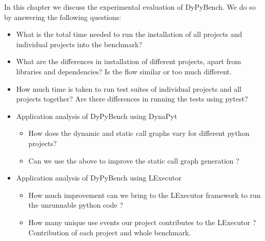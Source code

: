 In this chapter we discuss the experimental evaluation of DyPyBench. We do so by answering the following questions:
\begin{itemize}
    \item What is the total time needed to run the installation of all projects and individual projects into the benchmark?
    \item What are the differences in installation of different projects, apart from libraries and dependencies? Is the flow similar or too much different.
    \item How much time is taken to run test suites of individual projects and all projects together? Are there differences in running the tests using pytest?
    \item Application analysis of DyPyBench using DynaPyt
    \begin{itemize}
        \item How does the dynamic and static call graphs vary for different python projects?
        \item Can we use the above to improve the static call graph generation ?
    \end{itemize}
    \item Application analysis of DyPyBench using LExecutor
    \begin{itemize}
        \item How much improvement can we bring to the LExecutor framework to run the unrunnable python code ?
        \item How many unique use events our project contributes to the LExecutor ? Contribution of each project and whole benchmark.
    \end{itemize}
\end{itemize}
